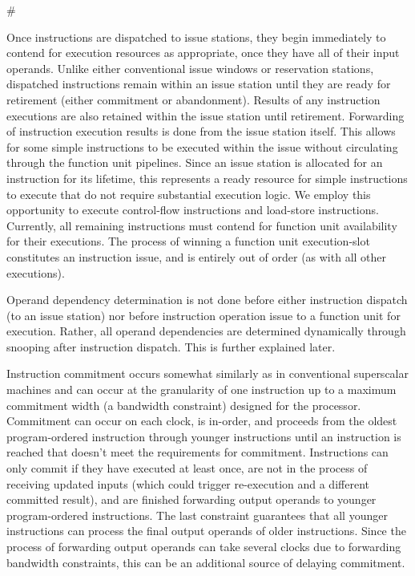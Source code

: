 #\documentclass[10pt,dvips]{article}
\begin{document}
Once instructions are dispatched to issue stations,
they begin immediately to contend for execution resources
as appropriate,
once they have all of their input operands.
Unlike either conventional issue windows or reservation stations,
dispatched instructions remain within an issue station until they are
ready for retirement (either commitment or abandonment).
Results of any instruction executions are also retained within
the issue station until retirement.  
Forwarding of instruction execution
results is done from the issue station itself.
This allows for some simple instructions to be executed within
the issue without circulating through the function unit
pipelines.  Since an issue station is allocated for an instruction for
its lifetime, this represents a ready resource for simple
instructions to execute that do not require substantial
execution logic.  We employ this opportunity to execute
control-flow instructions and load-store instructions.
Currently, all remaining instructions must contend for 
function unit availability for their executions.
The process of winning a function unit execution-slot constitutes
an instruction issue, and is entirely out of order (as with
all other executions).

Operand dependency determination is not done before
either instruction dispatch (to an issue station) nor
before instruction operation issue to a function unit for
execution.
Rather, all operand dependencies are determined dynamically through
snooping after instruction dispatch.
This is further explained later.

Instruction commitment occurs somewhat similarly as in
conventional superscalar machines and can occur at the
granularity of one instruction up to a maximum commitment
width (a bandwidth constraint) designed for the processor.
Commitment can occur on each clock, is in-order, and
proceeds from the oldest program-ordered
instruction through younger instructions until an instruction
is reached that doesn't meet the requirements for commitment.
Instructions can only commit if they have executed at least once,
are not in the process of receiving updated inputs (which could
trigger re-execution and a different committed result),
and are finished forwarding output operands 
to younger program-ordered instructions.  
The last constraint guarantees that all younger
instructions can process the final output operands of older
instructions.
Since the process of forwarding output operands can take several
clocks due to forwarding bandwidth constraints, this can be
an additional source of delaying commitment.
\end{document}
